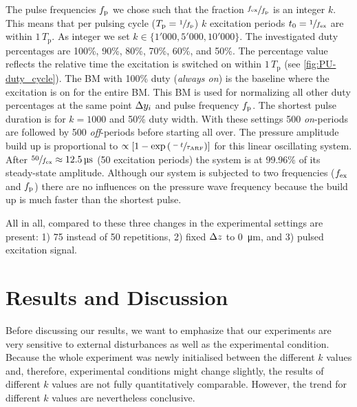 The pulse frequencies $f_{\mathrm{p}}$ we chose such that the fraction $\sfrac{f_{\mathrm{ex}}}{f_{\mathrm{p}}}$ 
is an integer $k$. This means that per pulsing cycle 
($T_{\mathrm{p}}=\sfrac{1}{f_{\mathrm{p}}}$) $k$ excitation periods 
$t_{0}=\sfrac{1}{f_{\mathrm{ex}}}$ are within $1\,T_{\mathrm{p}}$. As integer we set 
$k\in\{1'000, 5'000, 10'000\}$. The investigated duty percentages are 100\%, 
90\%, 80\%, 70\%, 60\%, and 50\%. The percentage value reflects the relative 
time the excitation is switched on within $1\,T_{\mathrm{p}}$ (see 
\cref{fig:PU-duty_cycle}). The BM with 100\% duty (\emph{always on}) is the 
baseline where the excitation is on for the entire BM. This BM is used for 
normalizing all other duty percentages at the same point $\Delta y_{i}$ and pulse 
frequency $f_{\mathrm{p}}$. The shortest pulse duration is for $k=1000$ and 50\% duty 
width. With these settings 500 \emph{on}-periods are followed by 500 
\emph{off}-periods before starting all over. The pressure amplitude build up is 
proportional to $\propto\left[ 1-\exp\left( \sfrac{-t}{\tau_{\mathrm{ARF}}} 
\right) \right]$ for this linear oscillating system. After 
$\sfrac{50}{\fex}\approx\SI{12.5}{\us}$ (50 excitation periods) the system is 
at 99.96\% of its steady-state amplitude. Although our system is subjected to 
two frequencies ($f_{\mathrm{ex}}$ and $f_{\mathrm{p}}$) there are no influences on the pressure wave 
frequency because the build up is much faster than the shortest pulse.

All in all, compared to \cite{Goering2021} these three changes in the 
experimental settings are present: 1) 75 instead of 50 repetitions, 2) fixed 
$\Delta z$ to \SI{0}{\um}, and 3) pulsed excitation signal.

\section{Results and Discussion}

Before discussing our results, we want to emphasize that our experiments are 
very sensitive to external disturbances as well as the experimental condition. 
Because the whole experiment was newly initialised between the different $k$ 
values and, therefore, experimental conditions might change slightly, the 
results of different $k$ values are not fully quantitatively comparable. 
However, the trend for different $k$ values are nevertheless conclusive.

